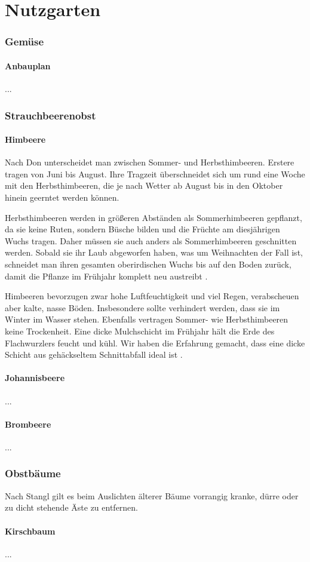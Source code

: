 \part{Nutzgarten}

\pagebreak

\section{Gemüse}

\subsection{Anbauplan}
...

\section{Strauchbeerenobst}

\subsection{Himbeere}
\label{Himbeere}

Nach Don \cite[S.~420]{Don2021} unterscheidet man zwischen Sommer- und Herbsthimbeeren.
Erstere tragen von Juni bis August.
Ihre Tragzeit überschneidet sich um rund eine Woche mit den Herbsthimbeeren, die je nach Wetter ab August bis in den Oktober hinein geerntet werden können.

Herbsthimbeeren werden in größeren Abständen als Sommerhimbeeren gepflanzt, da sie keine Ruten, sondern Büsche bilden und die Früchte am diesjährigen Wuchs tragen.
Daher müssen sie auch anders als Sommerhimbeeren geschnitten werden.
Sobald sie ihr Laub abgeworfen haben, was um Weihnachten der Fall ist, schneidet man ihren gesamten oberirdischen Wuchs bis auf den Boden zurück, damit die Pflanze im Frühjahr komplett neu austreibt \cite[S.~421]{Don2021}.

Himbeeren bevorzugen zwar hohe Luftfeuchtigkeit und viel Regen, verabscheuen aber kalte, nasse Böden.
Insbesondere sollte verhindert werden, dass sie im Winter im Wasser stehen.
Ebenfalls vertragen Sommer- wie Herbsthimbeeren keine Trockenheit.
Eine dicke Mulchschicht im Frühjahr hält die Erde des Flachwurzlers feucht und kühl.
Wir haben die Erfahrung gemacht, dass eine dicke Schicht aus gehäckseltem Schnittabfall ideal ist \cite[S.~421]{Don2021}.


\subsection{Johannisbeere}
...

\subsection{Brombeere}
...

\section{Obstbäume}
\label{Bäume}

Nach Stangl \cite[S.~256]{Stangl1995} gilt es beim Auslichten älterer Bäume vorrangig kranke, dürre oder zu dicht stehende Äste zu entfernen.

\subsection{Kirschbaum}
...



\pagebreak